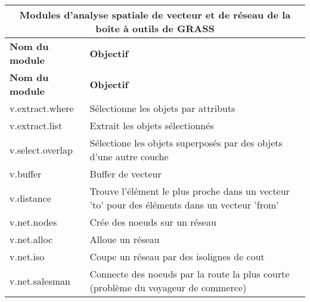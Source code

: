 \begin{table}[H]
\centering
 \begin{tabular}{|p{4cm}|p{10cm}|}
  \hline \multicolumn{2}{|c|}{\textbf{Modules d'analyse spatiale de vecteur et de réseau de la boîte à outils de GRASS}} \\
  \hline \textbf{Nom du module} & \textbf{Objectif} \\
  \hline \textbf{Nom du module} & \textbf{Objectif} \\
  \hline v.extract.where & Sélectionne les objets par attributs\\
  \hline v.extract.list & Extrait les objets sélectionnés\\
  \hline v.select.overlap & Sélectione les objets superposés par des objets d'une autre couche\\
  \hline v.buffer & Buffer de vecteur\\
  \hline v.distance & Trouve l'élément le plus proche dans un vecteur 'to' pour des éléments dans un vecteur 'from'\\
  \hline v.net.nodes & Crée des noeuds sur un réseau\\
  \hline v.net.alloc & Alloue un réseau\\
  \hline v.net.iso & Coupe un réseau par des isolignes de cout\\
  \hline v.net.salesman & Connecte des noeuds par la route la plus courte (problème du voyageur de commerce) \\

\end{tabular}
\end{table}
